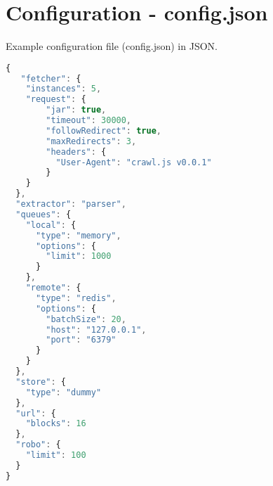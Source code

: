 
\chapter{Configuration - config.json} %

\label{appendix:config.json} %


Example configuration file (config.json) in JSON.\cite{wiki:json}

\begin{lstlisting}[language=JavaScript]
{
   "fetcher": {
    "instances": 5,
    "request": {
        "jar": true,
        "timeout": 30000,
        "followRedirect": true,
        "maxRedirects": 3,
        "headers": {
          "User-Agent": "crawl.js v0.0.1"
        }
    }
  },
  "extractor": "parser",
  "queues": {
    "local": {
      "type": "memory",
      "options": {
        "limit": 1000
      }
    },
    "remote": {
      "type": "redis",
      "options": {
        "batchSize": 20,
        "host": "127.0.0.1",
        "port": "6379"
      }
    }
  },
  "store": {
    "type": "dummy"
  },
  "url": {
    "blocks": 16
  },
  "robo": {
    "limit": 100
  }
}
\end{lstlisting}